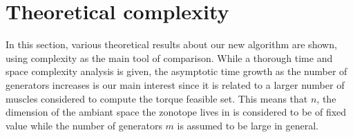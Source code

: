

\section{Theoretical complexity}
\label{time_complexity_edgeenum}
In this section, various theoretical results about our new algorithm are shown, using complexity as the main tool of comparison. While a thorough time and space complexity analysis is given, the asymptotic time growth as the number of generators increases is our main interest since it is related to a larger number of muscles considered to compute the torque feasible set. This means that $n$, the dimension of the ambiant space the zonotope lives in is considered to be of fixed value while the number of generators $m$ is assumed to be large in general.

